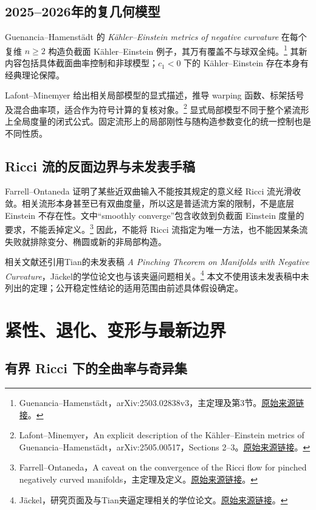 \documentclass[11pt,a4paper]{article}
\theoremstyle{definition}
\newcommand{\src}[3]{\footnote{\raggedright #1，#2。\href{#3}{原始来源链接}。}}
\begin{document}
\subsection{2025--2026年的复几何模型}

Guenancia--Hamenstädt 的 \emph{Kähler--Einstein metrics of negative curvature} 在每个复维 $n\ge2$ 构造负截面 Kähler--Einstein 例子，其万有覆盖不与球双全纯。\src{Guenancia--Hamenstädt}{arXiv:2503.02838v3，主定理及第3节}{https://arxiv.org/abs/2503.02838v3}
其新内容包括具体截面曲率控制和非球模型；$c_1<0$ 下的 Kähler--Einstein 存在本身有经典理论保障。

Lafont--Minemyer 给出相关局部模型的显式描述，推导 warping 函数、标架括号及混合曲率项，适合作为符号计算的复核对象。\src{Lafont--Minemyer}{An explicit description of the Kähler--Einstein metrics of Guenancia--Hamenstädt，arXiv:2505.00517，Sections 2--3}{https://arxiv.org/abs/2505.00517}
显式局部模型不同于整个紧流形上全局度量的闭式公式。固定流形上的局部刚性与随构造参数变化的统一控制也是不同性质。

\subsection{Ricci 流的反面边界与未发表手稿}

Farrell--Ontaneda 证明了某些近双曲输入不能按其规定的意义经 Ricci 流光滑收敛。相关流形本身甚至已有双曲度量，所以这是普适流方案的限制，不是底层 Einstein 不存在性。文中“smoothly converge”包含收敛到负截面 Einstein 度量的要求，不能丢掉定义。\src{Farrell--Ontaneda}{A caveat on the convergence of the Ricci flow for pinched negatively curved manifolds，主定理及定义}{https://arxiv.org/abs/math/0311176v2}
因此，不能将 Ricci 流指定为唯一方法，也不能因某条流失败就排除变分、椭圆或新的非局部构造。

相关文献还引用Tian的未发表稿 \emph{A Pinching Theorem on Manifolds with Negative Curvature}，Jäckel的学位论文也与该夹逼问题相关。\src{Jäckel}{研究页面及与Tian夹逼定理相关的学位论文}{https://www.friederjaeckel.com/research}
本文不使用该未发表稿中未列出的定理；公开稳定性结论的适用范围由前述具体假设确定。

\section{紧性、退化、变形与最新边界}\label{sec:frontier}

\subsection{有界 Ricci 下的全曲率与奇异集}
\end{document}
